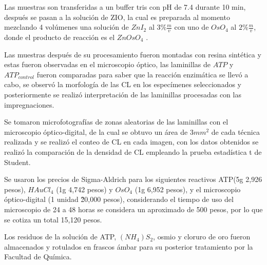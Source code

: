 


Las muestras son transferidas a un buffer tris con pH de 7.4 durante 10 min, después se pasan a la solución de ZIO, la cual es preparada al momento mezclando 4 volúmenes una solución de $ZnI_{2}$ al $3\%\frac{m}{v}$ con uno de $OsO_{4}$ al $2\%\frac{m}{v}$, donde el producto de reacción es el $ZnOsO_{4}$ \cite{article:productoZIO}.


Las muestras después de su procesamiento fueron montadas con resina sintética y estas fueron observadas en el microscopio óptico, las laminillas de $ATP$ y $ATP_{control}$ fueron comparadas para saber que la reacción enzimática se llevó a cabo, se observó la morfología de las CL en los especímenes seleccionados y posteriormente se realizó interpretación de las laminillas procesadas con las impregnaciones.


Se tomaron microfotografías de zonas aleatorias de las laminillas con el microscopio óptico-digital, de la cual se obtuvo un área de $3mm^{2}$ de cada técnica realizada y se realizó el conteo de CL en cada imagen, con los datos obtenidos se realizó la comparación de la densidad de CL empleando la prueba estadística t de Student.


Se usaron los precios de Sigma-Aldrich para los siguientes reactivos ATP(5g 2,926 pesos), $HAuCl_{4}$ (1g 4,742 pesos) y $OsO_{4}$ (1g 6,952 pesos), y el microscopio óptico-digital (1 unidad \~20,000 pesos), considerando el tiempo de uso del microscopio de 24 a 48 horas se considera un aproximado de 500 pesos, por lo que se cotiza un total 15,120 pesos.


Los residuos de la solución de ATP, $(NH_{4})S_{2}$, osmio y cloruro de oro fueron almacenados y rotulados en frascos ámbar para su posterior tratamiento por la Facultad de Química.


